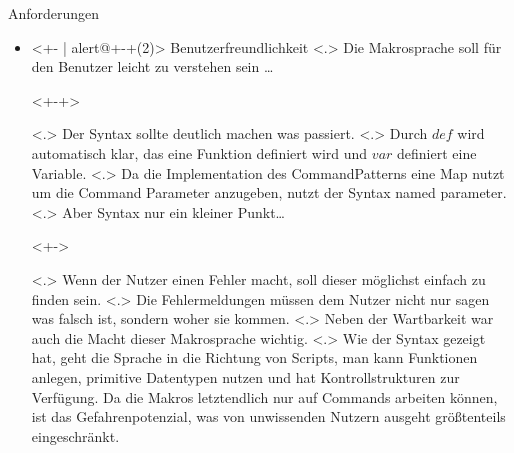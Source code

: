 \begin{frame}{Anforderungen}
\begin{itemize}
{              Ein Beispiel wäre \ldots
            }
        \begin{uncoverenv}<+->%
          \tabto{4.5cm}
          \myMIn$if(has_unsaved()) \{ save(); \}$
        \end{uncoverenv}
            \note[item]<.>{
              Das ein Makro nur probiert zu speichern, wenn es etwas zum speichern gibt. Generell sollte speichern schnell gehen, allerdings kann es passieren, dass eine mehrere Gigabyte große Datei geschrieben werden muss, was man dem Nutzer nicht zumuten möchte.
            }
      \item<+- | alert@+-+(2)>
        Benutzerfreundlichkeit%
            \note[item]<.>{
              Die Makrosprache soll für den Benutzer leicht zu verstehen sein \ldots
            }
        \begin{uncoverenv}<+-+>%
          \begin{myInvBox}[width=.9\linewidth]
            
          \end{myInvBox}
          \vspace{-10em}
        \end{uncoverenv}
            \note[item]<.>{
              Der Syntax sollte deutlich machen was passiert.
            }
            \note[item]<.>{
              Durch \myMIn$def$ wird automatisch klar, das eine Funktion definiert wird und \myMIn$var$ definiert eine Variable.
            }
            \note[item]<.>{
              Da die Implementation des CommandPatterns eine Map nutzt um die Command Parameter anzugeben, nutzt der Syntax named parameter.
            }
            \note[item]<.>{
              Aber Syntax nur ein kleiner Punkt\ldots
            }

        \begin{uncoverenv}<+->%
          \begin{myInvBox}[width=.9\linewidth]
            
          \end{myInvBox}
          \vspace{-6em}
        \end{uncoverenv}
            \note[item]<.>{
              Wenn der Nutzer einen Fehler macht, soll dieser möglichst einfach zu finden sein.
            }
            \note[item]<.>{
              Die Fehlermeldungen müssen dem Nutzer nicht nur sagen was falsch ist, sondern woher sie kommen.
            }
        \onslide<+->
            \note[item]<.>{
              Neben der Wartbarkeit war auch die Macht dieser Makrosprache wichtig.
            }
            \note[item]<.>{
              Wie der Syntax gezeigt hat, geht die Sprache in die Richtung von Scripts, man kann Funktionen anlegen, primitive Datentypen nutzen und hat Kontrollstrukturen zur Verfügung. Da die Makros letztendlich nur auf Commands arbeiten können, ist das Gefahrenpotenzial, was von unwissenden Nutzern ausgeht größtenteils eingeschränkt.
            }
    \end{itemize}
  \end{frame}

